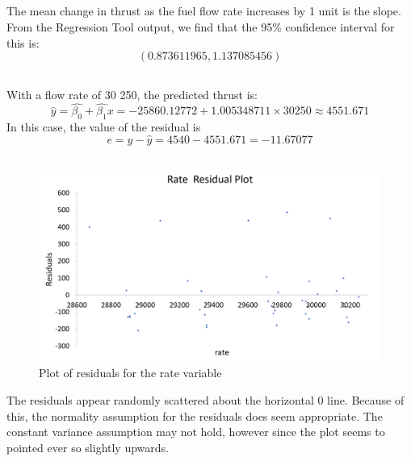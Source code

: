 \documentclass[letterpaper]{article}
\begin{document}
\subsection{}
The mean change in thrust as the fuel flow rate increases by 1 unit is the slope.
From the Regression Tool output, we find that the 95\% confidence interval
for this is:
$$(0.873611965, 1.137085456)$$

\subsection{}

With a flow rate of 30 250, the predicted thrust is:
$$\hat{y} = \hat{\beta_0} + \hat{\beta_1}x = -25860.12772 + 1.005348711 \times 30250 \approx 4551.671 $$
In this case, the value of the residual is
$$e = y-\hat{y} = 4540 - 4551.671 = -11.67077$$

\subsection{}

\begin{figure}[H]
 \centering
 \includegraphics[width=\textwidth]{rateresidual.png}
 \caption{Plot of residuals for the rate variable}
\end{figure}
The residuals appear randomly scattered about the horizontal 0 line.
Because of this, the normality assumption for the
residuals does seem appropriate.
The constant variance assumption may not hold, however
since the plot seems to pointed ever so slightly upwards.
\end{document}
